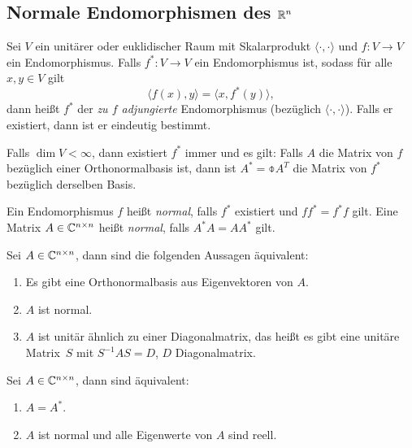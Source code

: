 \subsection{Normale Endomorphismen des \texorpdfstring{$\mathbb{R}^n$}{IRn}}
\begin{mydef}
Sei $V$ ein unitärer oder euklidischer Raum mit Skalarprodukt $\langle \cdot, \cdot \rangle$ und $f:V \to V$ ein Endomorphismus. Falls $f^*:V \to V$ ein Endomorphismus ist, sodass für alle $x,y \in V$ gilt
\[ \langle f(x), y \rangle = \langle x, f^*(y) \rangle, \]
dann heißt $f^*$ der \emph{zu $f$ adjungierte} Endomorphismus (bezüglich $\langle \cdot, \cdot \rangle$). Falls er existiert, dann ist er eindeutig bestimmt.

Falls $\dim V < \infty$, dann existiert $f^*$ immer und es gilt: Falls $A$ die Matrix von $f$ bezüglich einer Orthonormalbasis ist, dann ist $A^* = \obar{A}^T$ die Matrix von $f^*$ bezüglich derselben Basis.

Ein Endomorphismus $f$ heißt \emph{normal}, falls $f^*$ existiert und $f f^* = f^* f$ gilt. Eine Matrix $A \in \mathbb{C}^{n \times n}$ heißt \emph{normal}, falls $A^* A = A A^*$ gilt.
\end{mydef}

\begin{thm}
 Sei $A \in \mathbb{C}^{n \times n}$, dann sind die folgenden Aussagen äquivalent:
 \begin{enumerate}[(1)]
  \item Es gibt eine Orthonormalbasis aus Eigenvektoren von $A$.
  \item $A$ ist normal.
  \item $A$ ist unitär ähnlich zu einer Diagonalmatrix, das heißt es gibt eine unitäre Matrix\footnotemark\, $S$ mit $S^{-1} A S = D$, $D$ Diagonalmatrix.
 \end{enumerate}
\end{thm}

\begin{folg}
 Sei $A \in \mathbb{C}^{n \times n}$, dann sind äquivalent:
 \begin{enumerate}[(1)]
  \item $A = A^*$.
  \item $A$ ist normal und alle Eigenwerte von $A$ sind reell.
 \end{enumerate}
\end{folg}

